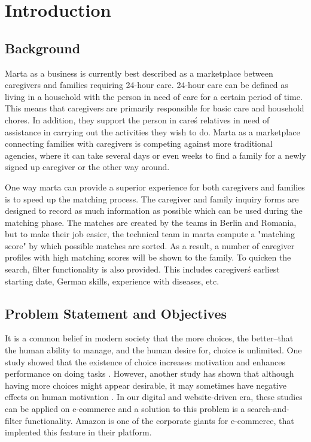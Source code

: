 \newpage
\section{Introduction}

\subsection{Background}

Marta as a business is currently best described as a marketplace between caregivers and families requiring 24-hour care. 24-hour care can be defined as living in a household with the person in need of care for a certain period of time. This means that caregivers are primarily responsible for basic care and household chores. In addition, they support the person in care\'s relatives in need of assistance in carrying out the activities they wish to do. Marta as a marketplace connecting families with caregivers is competing against more traditional agencies, where it can take several days or even weeks to find a family for a newly signed up caregiver or the other way around.

One way marta can provide a superior experience for both caregivers and families is to speed up the matching process. The caregiver and family inquiry forms are designed to record as much information as possible which can be used during the matching phase. The matches are created by the teams in Berlin and Romania, but to make their job easier, the technical team in marta compute a "matching score" by which possible matches are sorted. As a result, a number of caregiver profiles with high matching scores will be shown to the family. To quicken the search, filter functionality is also provided. This includes caregiver\'s earliest starting date, German skills, experience with diseases, etc.

\subsection{Problem Statement and Objectives}

It is a common belief in modern society that the more choices, the better--that the human ability to manage, and the human desire for, choice is unlimited. One study showed that the existence of choice increases motivation and enhances performance on doing tasks \cite{zuckerman1978importance}. However, another study has shown that although having more choices might appear desirable, it may sometimes have negative effects on human motivation \cite{iyengar2000choice}. In our digital and website-driven era, these studies can be applied on e-commerce and a solution to this problem is a search-and-filter functionality. Amazon is one of the corporate giants for e-commerce, that implented this feature in their platform.

